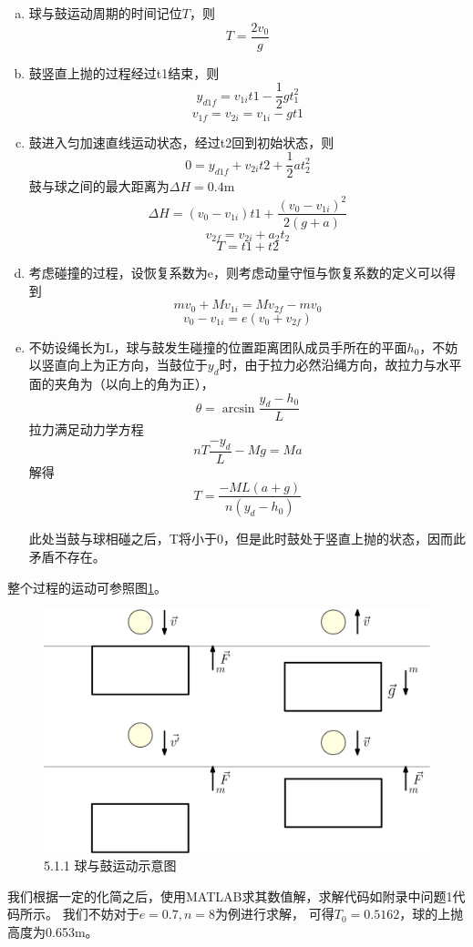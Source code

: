 \documentclass[nocover]{cumcmart}%
\begin{document}
\begin{enumerate}[(a)]
\item
球与鼓运动周期的时间记位$T$，则
$$T = \frac{2v_0}{g}$$
    \item
    鼓竖直上抛的过程经过t1结束，则
    $$y_{d1f} = v_{1i}t1 - \frac{1}{2}g t_1^2$$
    $$v_{1f} = v_{2i} = v_{1i}-gt1$$
    \item
    鼓进入匀加速直线运动状态，经过t2回到初始状态，则
    $$0 = y_{d1f} + v_{2i}t2 + \frac{1}{2}a t_2^2$$
    鼓与球之间的最大距离为$\Delta H = 0.4$m
    $$\Delta H = (v_0 - v_{1i})t1 + \frac{(v_0 -v_{1i})^2}{2(g+a)}$$
    $$v_{2f} = v_{2i} + a_2 t_2$$
    $$T = t1 + t2$$
    \item
    考虑碰撞的过程，设恢复系数为e，则考虑动量守恒与恢复系数的定义可以得到
    $$m v_0 + M v_{1i} = M v_{2f} - m v_{0}$$
    $$v_0 - v_{1i} = e(v_0 + v_{2f})$$
    \item
    不妨设绳长为L，球与鼓发生碰撞的位置距离团队成员手所在的平面$h_0$，不妨以竖直向上为正方向，当鼓位于$y_d$时，由于拉力必然沿绳方向，故拉力与水平面的夹角为（以向上的角为正），
    $$\theta = \arcsin{\frac{y_d - h_0}{L}}$$
    拉力满足动力学方程
    $$n T \frac{-y_d}{L}-Mg = Ma$$
    解得
    $$T = \frac{-ML(a+g)}{n (y_d - h_0)}$$
   
    此处当鼓与球相碰之后，T将小于0，但是此时鼓处于竖直上抛的状态，因而此矛盾不存在。
    
\end{enumerate}

整个过程的运动可参照图\ref{5.1.1 球与鼓运动示意图}。

\begin{figure}[h!]
    \centering
    \includegraphics[width=0.65\linewidth]{figures/3.png}
    \caption{5.1.1 球与鼓运动示意图}
    \label{5.1.1 球与鼓运动示意图}
\end{figure}

我们根据一定的化简之后，使用MATLAB求其数值解，求解代码如附录中问题1代码所示。\cite{matlab应用}
我们不妨对于$e = 0.7, n = 8$为例进行求解，
可得$T_0=0.5162$，球的上抛高度为0.653m。
\end{document}
